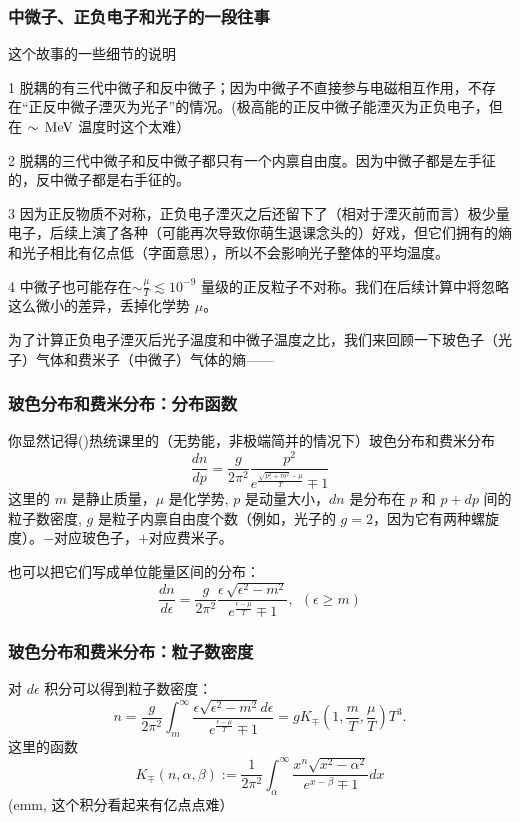\documentclass[CJK,13pt]{beamer}
\begin{document}
  \begin{frame}
    \frametitle{中微子、正负电子和光子的一段往事}

     这个故事的一些细节的说明
    \bitem
    \item[1]{脱耦的有三代中微子和反中微子；因为中微子不直接参与电磁相互作用，不存在“正反中微子湮灭为光子”的情况。(极高能的正反中微子能湮灭为正负电子，但在 $\sim\,\mathrm{MeV}$ 温度时这个太难）}
    \item[2]{脱耦的三代中微子和反中微子都只有一个内禀自由度。因为中微子都是左手征的，反中微子都是右手征的。}      
    \item[3]{因为正反物质不对称，正负电子湮灭之后还留下了（相对于湮灭前而言）极少量电子，后续上演了各种（可能再次导致你萌生退课念头的）好戏，但它们拥有的熵和光子相比有亿点低（字面意思），所以不会影响光子整体的平均温度。}
      \item[4]{中微子也可能存在$\sim \frac{\mu}{T}\lesssim 10^{-9}$ 量级的正反粒子不对称。我们在后续计算中将忽略这么微小的差异，丢掉化学势 $\mu$。}
        \eitem

  \end{frame}

  \begin{frame}

    为了计算正负电子湮灭后光子温度和中微子温度之比，我们来回顾一下玻色子（光子）气体和费米子（中微子）气体的熵——

  \end{frame}
  

  \begin{frame}
    \frametitle{玻色分布和费米分布：分布函数}
    你显然记得()热统课里的（无势能，非极端简并的情况下）玻色分布和费米分布
    $$\frac{dn}{d p} = \frac{g}{2\pi^2}\frac{p^2}{e^{\frac{\sqrt{p^2+m^2}- \mu}{T}}\mp 1}$$
    这里的 $m$ 是静止质量，$\mu$ 是化学势, $p$ 是动量大小，$dn$ 是分布在 $p$ 和 $p+dp$ 间的粒子数密度, $g$ 是粒子内禀自由度个数（例如，光子的 $g=2$，因为它有两种螺旋度）。$-$对应玻色子，$+$对应费米子。


    也可以把它们写成单位能量区间的分布：
    $$\frac{dn}{d\epsilon} = \frac{g}{2\pi^2}\frac{\epsilon  \,\sqrt{\epsilon^2-m^2}}{e^{\frac{\epsilon- \mu}{T}}\mp 1} ,\ \ (\epsilon\ge m)$$


  \end{frame}


  \begin{frame}
    \frametitle{玻色分布和费米分布：粒子数密度}
    对 $d\epsilon$ 积分可以得到粒子数密度：
    $$ n = \frac{g}{2\pi^2}\int_m^\infty \frac{\epsilon\sqrt{\epsilon^2-m^2}d\epsilon}{e^{\frac{\epsilon- \mu}{T}}\mp 1}=   gK_{\mp}(1,\frac{m}{T},\frac{\mu}{T}) T^3.$$
    这里的函数
     $$K_{\mp}(n, \alpha, \beta) := \frac{1}{2\pi^2}\int_\alpha^\infty \frac{x^n\sqrt{x^2-\alpha^2}}{e^{x-\beta}\mp 1} dx $$
    (\question emm, 这个积分看起来有亿点点难）
  \end{frame}
\end{document}
